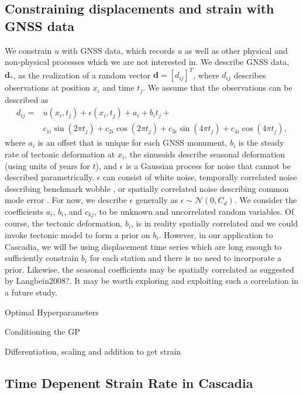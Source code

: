 \documentclass[10pt,a4paper]{article}
\begin{document}
\subsection{Constraining displacements and strain with GNSS data}
We constrain $u$ with GNSS data, which records $u$ as well as other physical and non-physical processes which we are not interested in. We describe GNSS data, $\bm{d}_*$, as the realization of a random vector $\bm{d} = [d_{ij}]^T$, where $d_{ij}$ describes observations at position $x_i$ and time $t_j$. We assume that the observations can be described as   
\begin{align}\label{eq:Data}
d_{ij} = &u(x_i,t_j) + \epsilon(x_i,t_j) + a_{i} + b_{i} t_j + \\
         &c_{1i}\sin(2 \pi t_j) + c_{2i}\cos(2 \pi t_j) + c_{3i}\sin(4 \pi t_j) + c_{4i}\cos(4 \pi t_j), 
\end{align}
where $a_i$ is an offset that is unique for each GNSS monument, $b_i$ is the steady rate of tectonic deformation at $x_i$, the sinusoids describe seasonal deformation (using units of years for $t$), and $\epsilon$ is a Gaussian process for noise that cannot be described parametrically. $\epsilon$ can consist of white noise, temporally correlated noise describing benchmark wobble \citep[e.g.,][]{Wyatt1982,Wyatt1989}, or spatially correlated noise describing common mode error \citep[e.g.,][]{Wdowinski1997}.  For now, we describe $\epsilon$ generally as $\epsilon \sim \mathcal{N}(0,C_d)$. We consider the coefficients $a_{i}$, $b_{i}$, and $c_{kj}$, to be unknown and uncorrelated random variables. Of course, the tectonic deformation, $b_i$, is in reality spatially correlated and we could invoke tectonic model to form a prior on $b_i$. However, in our application to Cascadia, we will be using displacement time series which are long enough to sufficiently constrain $b_i$ for each station and there is no need to incorporate a prior. Likewise, the seasonal coefficients may be spatially correlated as suggested by Langbein2008?. It may be worth exploring and exploiting such a correlation in a future study.       
     
Optimal Hyperparameters

Conditioning the GP

Differentiation, scaling and addition to get strain     

\subsection{Time Depenent Strain Rate in Cascadia}\label{sec:ApplicationsCascadia}
\end{document}

